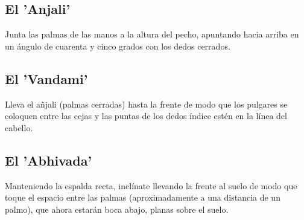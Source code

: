 \subsection{El 'Anjali'}

Junta las palmas de las manos a la altura del pecho, apuntando hacia arriba en un ángulo de cuarenta y cinco grados con los dedos cerrados.


\flushleft
\subsection{El 'Vandami'}

Lleva el añjali (palmas cerradas) hasta la frente de modo que los pulgares se coloquen entre las cejas y las puntas de los dedos índice estén en la línea del cabello.



\flushleft


\subsection{El 'Abhivada'}

Manteniendo la espalda recta, inclínate llevando la frente al suelo de modo que toque el espacio entre las palmas (aproximadamente a una distancia de un palmo), que ahora estarán boca abajo, planas sobre el suelo.


\flushleft

\restoreFont{}

